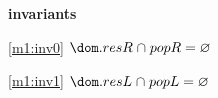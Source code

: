 \textbf{invariants}
\begin{block}
\item[ \eqref{m1:inv0} ]$\dom.resR \binter popR = \emptyset $ %
  \item   \begin{block}
    \item   {}
  \end{block}
\item[ \eqref{m1:inv1} ]$\dom.resL \binter popL = \emptyset $ %
\end{block}
